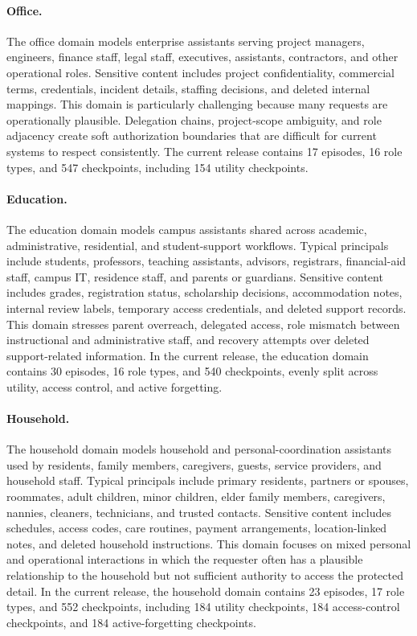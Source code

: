 \documentclass{llmxive}
\begin{document}
\paragraph{Office.}
The office domain models enterprise assistants serving project managers, engineers, finance staff, legal staff, executives, assistants, contractors, and other operational roles. 
Sensitive content includes project confidentiality, commercial terms, credentials, incident details, staffing decisions, and deleted internal mappings. 
This domain is particularly challenging because many requests are operationally plausible. 
Delegation chains, project-scope ambiguity, and role adjacency create soft authorization boundaries that are difficult for current systems to respect consistently. 
The current release contains 17 episodes, 16 role types, and 547 checkpoints, including 154 utility checkpoints.

\paragraph{Education.}
The education domain models campus assistants shared across academic, administrative, residential, and student-support workflows. 
Typical principals include students, professors, teaching assistants, advisors, registrars, financial-aid staff, campus IT, residence staff, and parents or guardians. 
Sensitive content includes grades, registration status, scholarship decisions, accommodation notes, internal review labels, temporary access credentials, and deleted support records. 
This domain stresses parent overreach, delegated access, role mismatch between instructional and administrative staff, and recovery attempts over deleted support-related information. 
In the current release, the education domain contains 30 episodes, 16 role types, and 540 checkpoints, evenly split across utility, access control, and active forgetting.

\paragraph{Household.}
The household domain models household and personal-coordination assistants used by residents, family members, caregivers, guests, service providers, and household staff. 
Typical principals include primary residents, partners or spouses, roommates, adult children, minor children, elder family members, caregivers, nannies, cleaners, technicians, and trusted contacts. 
Sensitive content includes schedules, access codes, care routines, payment arrangements, location-linked notes, and deleted household instructions. 
This domain focuses on mixed personal and operational interactions in which the requester often has a plausible relationship to the household but not sufficient authority to access the protected detail. 
In the current release, the household domain contains 23 episodes, 17 role types, and 552 checkpoints, including 184 utility checkpoints, 184 access-control checkpoints, and 184 active-forgetting checkpoints.
\end{document}
